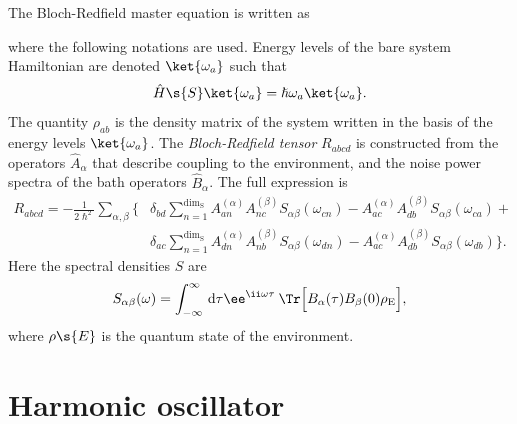 \documentclass[fontsize=9pt,bookmarkpackage=false]{scrartcl}
\renewcommand{\hbar}{\hslash}
\newcommand*{\mybx}[1]{\colorbox{mygr!15}{\hspace{1em}#1\hspace{1em}}}
\begin{document}
The Bloch-Redfield master equation is written as
where the following notations are used.
Energy levels of the bare system Hamiltonian are denoted $\ket{ \omega_a }$ such that
\begin{equation}
  \hat H\s{S} \ket{ \omega_a } = \hbar \omega_a \ket{ \omega_a }.
\end{equation}
The quantity $\rho_{ab }$ is the density matrix of the system written in the basis of the energy levels $\ket{ \omega_a }$.
The \emph{Bloch-Redfield tensor} $R_{abcd }$ is constructed from the operators $\hat A_\alpha$ that describe coupling to the environment, and the noise power spectra of the bath operators $\hat B_\alpha$.
The full expression is
\begin{equation}
    \label{eq:BR_tensor}
    \begin{split}
    R_{abcd} = -\frac{1}{2\hbar^2}\sum_{\alpha,\beta}\bigg\{ &\delta_{bd}\sum_{n=1}^{\dim_\mathrm{S}}
    A_{an}^{(\alpha)}A_{nc}^{(\beta)} S_{\alpha\beta}(\omega_{cn}) -
    A_{ac}^{(\alpha)}A_{db}^{(\beta)} S_{\alpha\beta}(\omega_{ca}) + \\ & \delta_{ac}\sum_{n=1}^{\dim_\mathrm{S}}
    A_{dn}^{(\alpha)}A_{nb}^{(\beta)} S_{\alpha\beta}(\omega_{dn}) -
    A_{ac}^{(\alpha)}A_{db}^{(\beta)} S_{\alpha\beta}(\omega_{db})
    \bigg\}.
    \end{split}
\end{equation}
Here the spectral densities $S$ are
\begin{equation}
    \label{eq:BR_noise_power_spectra}
    S_{\alpha\beta}(\omega) = \int_{-\infty}^{\infty} \dl{\tau} \ee^{\ii\omega\tau}\: \Tr\Big[B_\alpha(\tau)B_\beta(0)\rho_\mathrm{E}\Big],
\end{equation}
where $\rho\s{E}$ is the quantum state of the environment.


\cleardoublepage

\appendix
\appendixpage
\addappheadtotoc

\section*{Harmonic oscillator} %
\label{sec:harmonic_oscillator}
\end{document}

